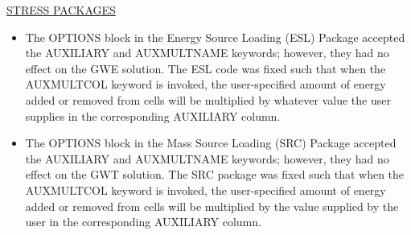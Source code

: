\underline{STRESS PACKAGES}
\begin{itemize}
\item The OPTIONS block in the Energy Source Loading (ESL) Package accepted the AUXILIARY and AUXMULTNAME keywords; however, they had no effect on the GWE solution.  The ESL code was fixed such that when the AUXMULTCOL keyword is invoked, the user-specified amount of energy added or removed from cells will be multiplied by whatever value the user supplies in the corresponding AUXILIARY column.
\item The OPTIONS block in the Mass Source Loading (SRC) Package accepted the AUXILIARY and AUXMULTNAME keywords; however, they had no effect on the GWT solution.  The SRC package was fixed such that when the AUXMULTCOL keyword is invoked, the user-specified amount of energy added or removed from cells will be multiplied by the value supplied by the user in the corresponding AUXILIARY column.
\end{itemize}
